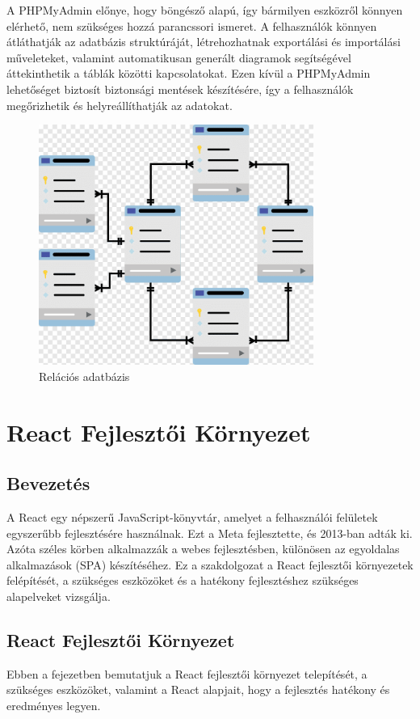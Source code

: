 \documentclass[colorlinks]{thesis-kando}
\theoremstyle{definition}
\theoremstyle{remark}
\begin{document}
A PHPMyAdmin előnye, hogy böngésző alapú, így bármilyen eszközről könnyen elérhető, nem szükséges hozzá parancssori ismeret. A felhasználók könnyen átláthatják az adatbázis struktúráját, létrehozhatnak exportálási és importálási műveleteket, valamint automatikusan generált diagramok segítségével áttekinthetik a táblák közötti kapcsolatokat. Ezen kívül a PHPMyAdmin lehetőséget biztosít biztonsági mentések készítésére, így a felhasználók megőrizhetik és helyreállíthatják az adatokat.

\begin{figure}[ht!]
	\centering
	\includegraphics[width=9cm]{figures/rdb.png}
	\caption[dotNET]{Relációs adatbázis}
\end{figure}
\pagebreak

\chapter{React Fejlesztői Környezet}

\section{Bevezetés}
A React egy népszerű JavaScript-könyvtár, amelyet a felhasználói felületek egyszerűbb fejlesztésére használnak. Ezt a Meta fejlesztette, és 2013-ban adták ki. Azóta széles körben alkalmazzák a webes fejlesztésben, különösen az egyoldalas alkalmazások (SPA) készítéséhez. Ez a szakdolgozat a React fejlesztői környezetek felépítését, a szükséges eszközöket és a hatékony fejlesztéshez szükséges alapelveket vizsgálja.

\section{React Fejlesztői Környezet}
Ebben a fejezetben bemutatjuk a React fejlesztői környezet telepítését, a szükséges eszközöket, valamint a React alapjait, hogy a fejlesztés hatékony és eredményes legyen.
\end{document}
